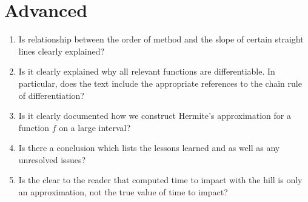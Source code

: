 \documentclass[a4paper,12pt]{article}
\begin{document}
\section{Advanced}

\begin{enumerate}
\item Is relationship between the order of method and the slope of certain straight lines clearly explained?

\item Is it clearly explained why all relevant functions are differentiable. In particular, does the text include the appropriate references to the chain rule of differentiation?
  
\item Is it clearly documented how we construct Hermite's approximation for a function $f$ on a large interval?

\item Is there a conclusion which lists the lessons learned and as well as any unresolved issues?

\item Is the clear to the reader that computed time to impact with the hill is only an approximation, not the true value of time to impact?
\end{enumerate}
\end{document}
